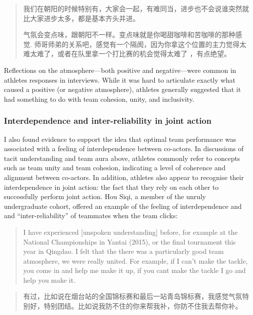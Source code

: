 \begin{CJK}{UTF8}{gbsn}
    \begin{quote}
      我们在朝阳的时候特别有，大家会一起，有难同当，进步也不会说谁突然就比大家进步太多，都是基本齐头并进。

      气氛会变点味，跟朝阳不一样。变点味就是你喝甜咖啡和苦咖啡的那种感觉. 师哥师弟的关系吧，感觉有一个隔阂，因为你拿这个位置的主力觉得太难太难了，或者在队里拿一个打比赛的机会觉得太难了 ，有点绝望。
    \end{quote}

Reflections on the atmosphere---both positive and negative---were common in athletes responses in interviews.  While it was hard to articulate exactly what caused a positive (or negative atmosphere), athletes generally suggested that it had something to do with team cohesion, unity, and inclusivity.

\subsubsection{Interdependence and inter-reliability in joint action}

I also found evidence to support the idea that optimal team performance was associated with a feeling of interdependence between co-actors.  In discussions of tacit understanding and team aura above, athletes commonly refer to concepts such as team unity and team cohesion, indicating a level of coherence and alignment between co-actors.  In addition, athletes also appear to recognise their interdependence in joint action: the fact that they rely on each other to successfully perform joint action.  Hou Siqi, a member of the unruly undergraduate cohort, offered an example of the feeling of interdependence and and ``inter-reliability'' of teammates when the team clicks:

  \begin{quote}
    I have experienced [unspoken understanding] before, for example at the National Championships in Yantai (2015), or the final tournament this year in Qingdao.  I felt that the there was a particularly good team atmosphere, we were really united.  For example, if I can't make the tackle, you come in and help me make it up, if you cant make the tackle I go and help you make it.
  \end{quote}

  \begin{quote}
    有过，比如说在烟台站的全国锦标赛和最后一站青岛锦标赛，我感觉气氛特别好，特别团结。比如说我防不住的你来帮我补，你防不住我去帮你补。
  \end{quote}



\end{CJK}
